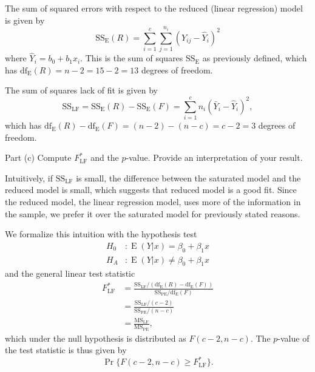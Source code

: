 \documentclass[
]{article}
\newenvironment{Shaded}{\begin{snugshade}}{\end{snugshade}}
\newcommand{\AttributeTok}[1]{\textcolor[rgb]{0.13,0.29,0.53}{#1}}
\newcommand{\DecValTok}[1]{\textcolor[rgb]{0.00,0.00,0.81}{#1}}
\newcommand{\FunctionTok}[1]{\textcolor[rgb]{0.13,0.29,0.53}{\textbf{#1}}}
\newcommand{\NormalTok}[1]{#1}
\newcommand{\OtherTok}[1]{\textcolor[rgb]{0.56,0.35,0.01}{#1}}
\newcommand{\SpecialCharTok}[1]{\textcolor[rgb]{0.81,0.36,0.00}{\textbf{#1}}}
\begin{document}
The sum of squared errors with respect to the reduced (linear
regression) model is given by \[
  \operatorname{SS_E}(R) = \sum_{i=1}^{c}\sum_{j=1}^{n_i} (Y_{i j} - \hat{Y}_i)^2
\] where \(\hat{Y}_i = b_0 + b_1 x_i\). This is the sum of squares
\(\operatorname{SS_E}\) as previously defined, which has
\(\operatorname{df_E}(R) = n-2 = 15-2 = 13\) degrees of freedom.

The sum of squares lack of fit is given by \[
  \operatorname{SS_{LF}}= \operatorname{SS_E}(R) - \operatorname{SS_E}(F) = \sum_{i=1}^{c} n_i(\bar{Y}_i - \hat{Y}_i)^2,
\] which has
\(\operatorname{df_E}(R) - \operatorname{df_E}(F) = (n-2) - (n-c) = c-2 = 3\)
degrees of freedom.

\begin{tcolorbox}[split=\f]
Part (c)
\tcblower
Compute $F_{\operatorname{LF}}^*$ and the $p$-value.
Provide an interpretation of your result.
\end{tcolorbox}

Intuitively, if \(\operatorname{SS_{LF}}\) is small, the difference
between the saturated model and the reduced model is small, which
suggests that reduced model is a good fit. Since the reduced model, the
linear regression model, uses more of the information in the sample, we
prefer it over the saturated model for previously stated reasons.

We formalize this intuition with the hypothesis test \begin{align*}
  H_0 &: \operatorname{E}(Y|x) = \beta_0 + \beta_1 x\\
  H_A &: \operatorname{E}(Y|x) \neq \beta_0 + \beta_1 x
\end{align*} and the general linear test statistic \begin{align*}
  F_{\text{LF}}^*
    &= \frac{\operatorname{SS_{LF}}/ (\operatorname{df_E}(R)-\operatorname{df_E}(F))}{\operatorname{SS_{PE}}/\operatorname{df_E}(F)}\\
    &= \frac{\operatorname{SS_{LF}}/ (c-2)}{\operatorname{SS_{PE}}/(n-c)}\\
    &= \frac{\operatorname{MS_{LF}}}{\operatorname{MS_{PE}}},
\end{align*} which under the null hypothesis is distributed as
\(F(c-2,n-c)\). The \(p\)-value of the test statistic is thus given by
\[
  \Pr\{F(c-2,n-c) \geq F_{\operatorname{LF}}^*\}.
\]

\begin{Shaded}
\end{Shaded}
\end{document}
